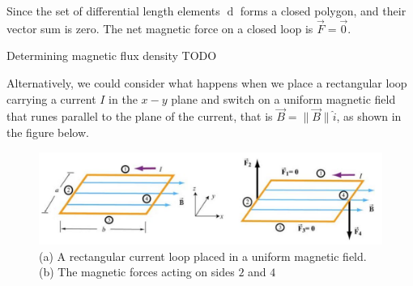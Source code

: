 Since the set of differential length elements $\mathop{\mathrm{d}\vec{s}}$ forms a closed polygon, and their vector sum is zero. The net magnetic force on a closed loop is $\vec{F} = \vec{0}$.

\begin{experiment}
Determining magnetic flux density TODO
\end{experiment}

Alternatively, we could consider what happens when we place a rectangular loop carrying a current $I$ in the $x - y$ plane and switch on a uniform magnetic field that runes parallel to the plane of the current, that is $\vec{B} = \| \vec{B} \| \hat{i}$, as shown in the figure below.

\begin{figure}[h!]
    \centering
    \includegraphics{notes/images/Magnetic-Feild-Current-Loop.JPG}
    \caption{(a) A rectangular current loop placed in a uniform magnetic field. (b) The magnetic forces acting on sides $2$ and $4$}
\end{figure}
\FloatBarrier

